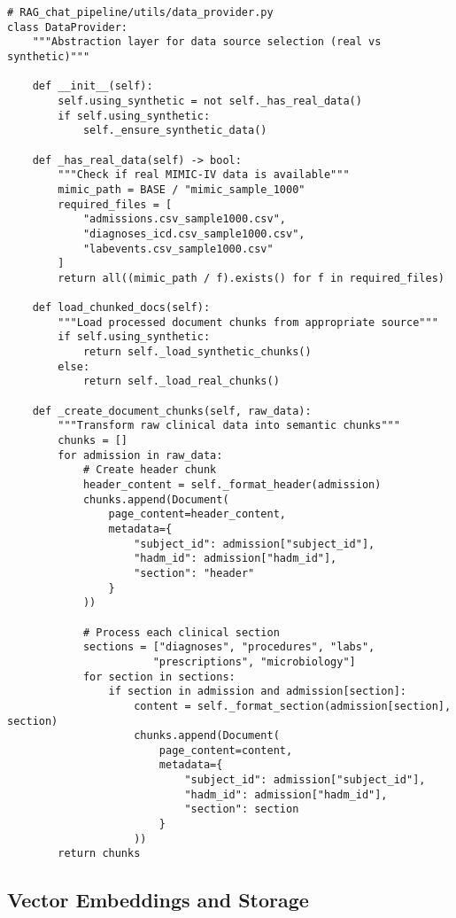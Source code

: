 \begin{verbatim}
# RAG_chat_pipeline/utils/data_provider.py
class DataProvider:
    """Abstraction layer for data source selection (real vs synthetic)"""
    
    def __init__(self):
        self.using_synthetic = not self._has_real_data()
        if self.using_synthetic:
            self._ensure_synthetic_data()
    
    def _has_real_data(self) -> bool:
        """Check if real MIMIC-IV data is available"""
        mimic_path = BASE / "mimic_sample_1000"
        required_files = [
            "admissions.csv_sample1000.csv",
            "diagnoses_icd.csv_sample1000.csv",
            "labevents.csv_sample1000.csv"
        ]
        return all((mimic_path / f).exists() for f in required_files)
    
    def load_chunked_docs(self):
        """Load processed document chunks from appropriate source"""
        if self.using_synthetic:
            return self._load_synthetic_chunks()
        else:
            return self._load_real_chunks()
    
    def _create_document_chunks(self, raw_data):
        """Transform raw clinical data into semantic chunks"""
        chunks = []
        for admission in raw_data:
            # Create header chunk
            header_content = self._format_header(admission)
            chunks.append(Document(
                page_content=header_content,
                metadata={
                    "subject_id": admission["subject_id"],
                    "hadm_id": admission["hadm_id"],
                    "section": "header"
                }
            ))
            
            # Process each clinical section
            sections = ["diagnoses", "procedures", "labs", 
                       "prescriptions", "microbiology"]
            for section in sections:
                if section in admission and admission[section]:
                    content = self._format_section(admission[section], section)
                    chunks.append(Document(
                        page_content=content,
                        metadata={
                            "subject_id": admission["subject_id"],
                            "hadm_id": admission["hadm_id"],
                            "section": section
                        }
                    ))
        return chunks
\end{verbatim}

\subsection{Vector Embeddings and Storage}


